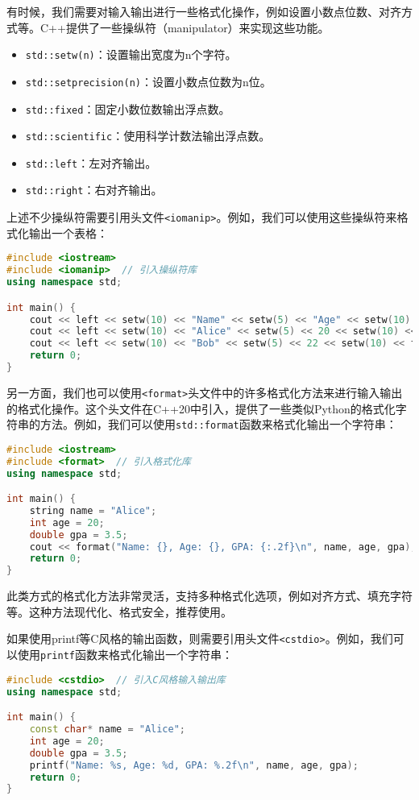 \documentclass[../main.tex]{subfiles}
\begin{document}
有时候，我们需要对输入输出进行一些格式化操作，例如设置小数点位数、对齐方式等。C++提供了一些操纵符（manipulator）来实现这些功能。
\begin{itemize}
  \item \texttt{std::setw(n)}：设置输出宽度为n个字符。
  \item \texttt{std::setprecision(n)}：设置小数点位数为n位。
  \item \texttt{std::fixed}：固定小数位数输出浮点数。
  \item \texttt{std::scientific}：使用科学计数法输出浮点数。
  \item \texttt{std::left}：左对齐输出。
  \item \texttt{std::right}：右对齐输出。
\end{itemize}

上述不少操纵符需要引用头文件\texttt{<iomanip>}。例如，我们可以使用这些操纵符来格式化输出一个表格：
\begin{lstlisting}[language=C++]
#include <iostream>
#include <iomanip>  // 引入操纵符库
using namespace std;

int main() {
    cout << left << setw(10) << "Name" << setw(5) << "Age" << setw(10) << "GPA" << endl;
    cout << left << setw(10) << "Alice" << setw(5) << 20 << setw(10) << fixed << setprecision(2) << 3.5 << endl;
    cout << left << setw(10) << "Bob" << setw(5) << 22 << setw(10) << fixed << setprecision(2) << 3.8 << endl;
    return 0;
}
\end{lstlisting}

另一方面，我们也可以使用\texttt{<format>}头文件中的许多格式化方法来进行输入输出的格式化操作。这个头文件在C++20中引入，提供了一些类似Python的格式化字符串的方法。例如，我们可以使用\texttt{std::format}函数来格式化输出一个字符串：
\begin{lstlisting}[language=C++]
#include <iostream>
#include <format>  // 引入格式化库
using namespace std;

int main() {
    string name = "Alice";
    int age = 20;
    double gpa = 3.5;
    cout << format("Name: {}, Age: {}, GPA: {:.2f}\n", name, age, gpa);
    return 0;
}
\end{lstlisting}
此类方式的格式化方法非常灵活，支持多种格式化选项，例如对齐方式、填充字符等。这种方法现代化、格式安全，推荐使用。

如果使用{printf}等C风格的输出函数，则需要引用头文件\texttt{<cstdio>}。例如，我们可以使用\texttt{printf}函数来格式化输出一个字符串：
\begin{lstlisting}[language=C++]
#include <cstdio>  // 引入C风格输入输出库
using namespace std;

int main() {
    const char* name = "Alice";
    int age = 20;
    double gpa = 3.5;
    printf("Name: %s, Age: %d, GPA: %.2f\n", name, age, gpa);
    return 0;
}
\end{lstlisting}
\end{document}

